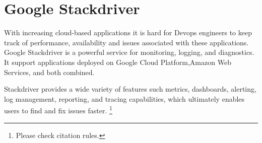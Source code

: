 \section{Google Stackdriver}

With increasing cloud-based applications it is hard for Devops engineers to keep
track of performance, availability and issues associated with these applications.
Google Stackdriver is a powerful service for monitoring, logging, and diagnostics. 
It support applications deployed on Google Cloud Platform,Amazon Web Services, and both combined.

Stackdriver provides a wide variety of features such metrics, dashboards, 
alerting, log management, reporting, and tracing capabilities, which 
ultimately enables users to find and fix issues faster. 
\cite{hid-sp18-602-google-stackdriver-main}\footnote{Please check citation rules.}

